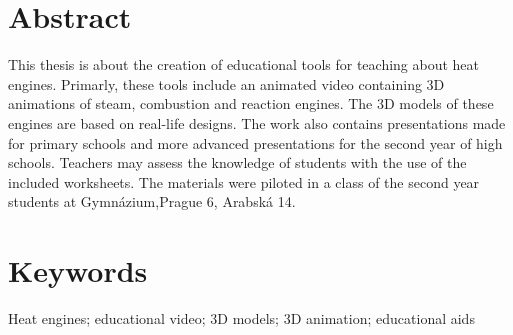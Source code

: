 \section*{Abstract}
{This thesis is about the creation of educational tools for teaching about heat engines. Primarly, these tools include an animated video containing 3D animations of steam, combustion and reaction engines. The 3D models of these engines are based on real-life designs. The work also contains presentations made for primary schools and more advanced presentations for the second year of high schools. Teachers may assess the knowledge of students with the use of the included worksheets. The materials were piloted in a class of the second year students at Gymnázium,Prague 6, Arabská 14.}

\section*{Keywords}
{Heat engines; educational video; 3D models; 3D animation; educational aids}

\newpage

\tableofcontents


\newpage
\pagestyle{plain}

